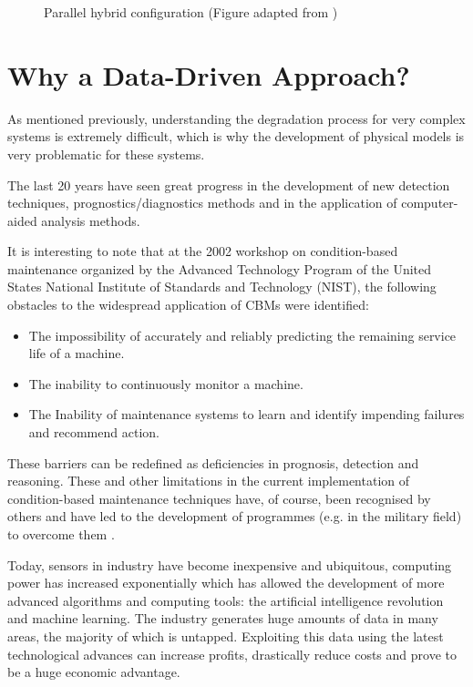 \begin{figure}[H]
    \centering
    
    \caption{Parallel hybrid configuration (Figure adapted from \cite{Mangili2013})}
    \label{fig:hybrid-approach-parallel}
\end{figure}


\section{Why a Data-Driven Approach?}
As mentioned previously, understanding the degradation process for very complex systems is extremely difficult, which is why the development of physical models is very problematic for these systems.

The last 20 years have seen great progress in the development of new detection techniques, prognostics/diagnostics methods and in the application of computer-aided analysis methods. 

It is interesting to note that at the 2002 workshop on condition-based maintenance organized by the Advanced Technology Program of the United States National Institute of Standards and Technology (NIST), the following obstacles to the widespread application of CBMs were identified:
\begin{itemize}%
    \item The impossibility of accurately and reliably predicting the remaining service life of a machine.
    \item The inability to continuously monitor a machine.
    \item The Inability of maintenance systems to learn and identify impending failures and recommend action.
\end{itemize} 

These barriers can be redefined as deficiencies in prognosis, detection and reasoning. These and other limitations in the current implementation of condition-based maintenance techniques have, of course, been recognised by others and have led to the development of programmes (e.g. in the military field) to overcome them \cite{Hess2008}.

Today, sensors in industry have become inexpensive and ubiquitous, computing power has increased exponentially which has allowed the development of more advanced algorithms and computing tools: the artificial intelligence revolution and machine learning. The industry generates huge amounts of data in many areas, the majority of which is untapped. Exploiting this data using the latest technological advances can increase profits, drastically reduce costs and prove to be a huge economic advantage.


